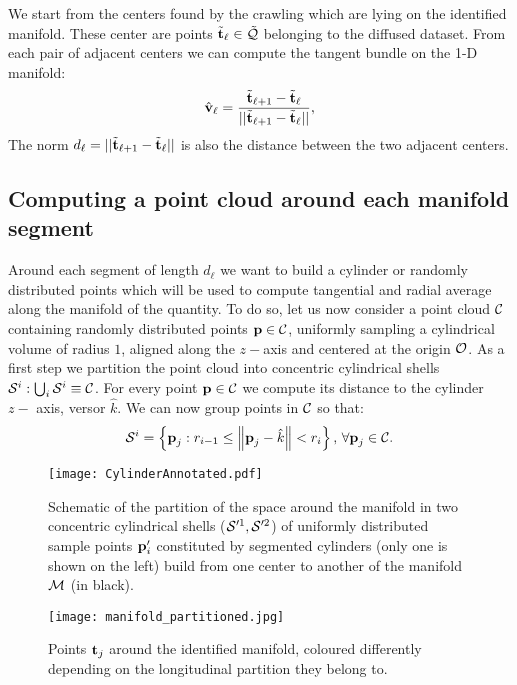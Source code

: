 We start from the centers found by the crawling which are lying on the identified manifold. These center are points $\tilde{\boldsymbol{\mathbf{t}}}_{\ell} \in \tilde{\mathcal{Q}}$ belonging to the diffused dataset.
From each pair of adjacent centers we can compute the tangent bundle on the 1-D manifold:
\begin{equation}
  \hat{\boldsymbol{\mathbf{v}}}_{\ell} =  \frac{\tilde{\boldsymbol{\mathbf{t}}}_{\ell + 1} - \tilde{\boldsymbol{\mathbf{t}}}_{\ell}}{|| \tilde{\boldsymbol{\mathbf{t}}}_{\ell + 1} - \tilde{\boldsymbol{\mathbf{t}}}_{\ell}||},
\end{equation}
The norm $d_{\ell} = || \tilde{\boldsymbol{\mathbf{t}}}_{\ell + 1} - \tilde{\boldsymbol{\mathbf{t}}}_{\ell}||$ is also the distance between the two adjacent centers.

\subsection{Computing a point cloud around each manifold segment}
Around each segment of length $d_{\ell}$ we want to build a cylinder or randomly distributed points which will be used to compute tangential and radial average along the manifold of the quantity.
To do so, let us now consider a point cloud $\mathcal{C}$ containing randomly distributed points $\boldsymbol{\mathbf{p}} \in \mathcal{C}$, uniformly sampling a cylindrical volume of radius $1$, aligned along the $z-$axis and centered at the origin $\mathcal{O}$.
As a first step we partition the point cloud into concentric cylindrical shells $\mathcal{S}^i: \bigcup_i \mathcal{S}^i \equiv \mathcal{C}$.
For every point $\boldsymbol{\mathbf{p}} \in \mathcal{C}$ we compute its distance to the cylinder $z-$ axis, versor $\hat k$.
We can now group points in $\mathcal{C}$ so that:
\begin{equation}
  \mathcal{S}^i =
  \left\{ \boldsymbol{\mathbf{p}}_j:  r_{i-1} \leq \norm{\boldsymbol{\mathbf{p}}_j-\hat{k}} < r_i \right\},\, \forall \boldsymbol{\mathbf{p}}_j \in \mathcal{C}.
\end{equation}

\begin{figure}
  \centering
  \texttt{[image: CylinderAnnotated.pdf]}
  \caption{Schematic of the partition of the space around the manifold in two concentric cylindrical shells ($\mathcal{S}'^1, \mathcal{S}'^2$) of uniformly distributed sample points $\boldsymbol{\mathbf{p}}'_i$ constituted by segmented cylinders (only one is shown on the left) build from one center to another of the manifold $\mathcal{M}$ (in black).}
  \label{fig:cylinder}
\end{figure}

\begin{figure}
  \centering
  \texttt{[image: manifold\_partitioned.jpg]}
  \caption{Points $\boldsymbol{\mathbf{t}}_j$ around the identified manifold, coloured differently depending on the longitudinal partition they belong to.}
  \label{fig:segmented_manifold}
\end{figure}

